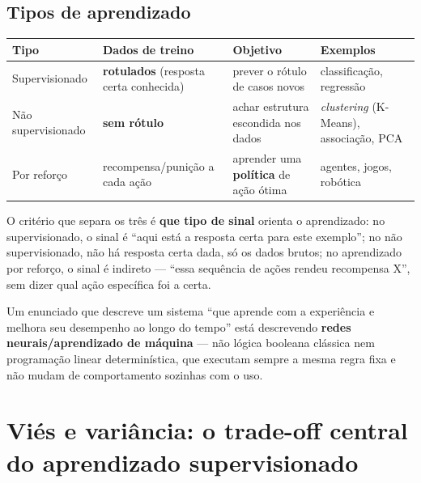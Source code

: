 \subsection{Tipos de aprendizado}

\begin{conceito}
\begin{center}
\begin{tabular}{@{}p{2.6cm}p{2.8cm}p{2.6cm}p{3cm}@{}}
\toprule
\textbf{Tipo} & \textbf{Dados de treino} & \textbf{Objetivo} & \textbf{Exemplos} \\
\midrule
Supervisionado & \textbf{rotulados} (resposta certa conhecida) & prever o
rótulo de casos novos & classificação, regressão \\
Não supervisionado & \textbf{sem rótulo} & achar estrutura escondida nos
dados & \textit{clustering} (K-Means), associação, PCA \\
Por reforço & recompensa/punição a cada ação & aprender uma
\textbf{política} de ação ótima & agentes, jogos, robótica \\
\bottomrule
\end{tabular}
\end{center}

O critério que separa os três é \textbf{que tipo de sinal} orienta o
aprendizado: no supervisionado, o sinal é “aqui está a resposta certa
para este exemplo”; no não supervisionado, não há resposta certa dada,
só os dados brutos; no aprendizado por reforço, o sinal é indireto ---
“essa sequência de ações rendeu recompensa X”, sem dizer qual ação
específica foi a certa.
\end{conceito}

\begin{cuidado}
Um enunciado que descreve um sistema “que aprende com a experiência e
melhora seu desempenho ao longo do tempo” está descrevendo \textbf{redes
neurais/aprendizado de máquina} --- não lógica booleana clássica nem
programação linear determinística, que executam sempre a mesma regra fixa
e não mudam de comportamento sozinhas com o uso.
\end{cuidado}

\section{Viés e variância: o trade-off central do aprendizado supervisionado}

